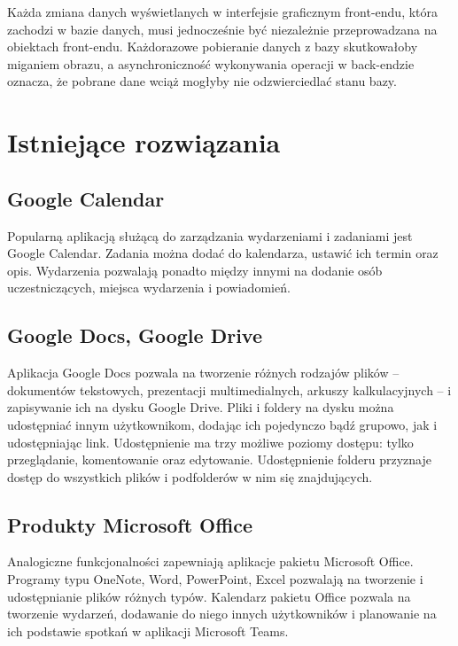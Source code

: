 \documentclass[a4paper,twoside,12pt]{book}
\begin{document}
Każda zmiana danych wyświetlanych w interfejsie graficznym front-endu, która zachodzi w bazie danych, musi jednocześnie być niezależnie przeprowadzana na obiektach front-endu. Każdorazowe pobieranie danych z bazy skutkowałoby miganiem obrazu, a asynchroniczność wykonywania operacji w back-endzie oznacza, że pobrane dane wciąż mogłyby nie odzwierciedlać stanu bazy.

\section{Istniejące rozwiązania}
\subsection{Google Calendar}
Popularną aplikacją służącą do zarządzania wydarzeniami i zadaniami jest Google Calendar. Zadania można dodać do kalendarza, ustawić ich termin oraz opis. Wydarzenia pozwalają ponadto między innymi na dodanie osób uczestniczących, miejsca wydarzenia i powiadomień.
\subsection{Google Docs, Google Drive}
Aplikacja Google Docs pozwala na tworzenie różnych rodzajów plików -- dokumentów tekstowych, prezentacji multimedialnych, arkuszy kalkulacyjnych -- i zapisywanie ich na dysku Google Drive. Pliki i foldery na dysku można udostępniać innym użytkownikom, dodając ich pojedynczo bądź grupowo, jak i udostępniając link. Udostępnienie ma trzy możliwe poziomy dostępu: tylko przeglądanie, komentowanie oraz edytowanie. Udostępnienie folderu przyznaje dostęp do wszystkich plików i podfolderów w nim się znajdujących.
\subsection{Produkty Microsoft Office}
Analogiczne funkcjonalności zapewniają aplikacje pakietu Microsoft Office. Programy typu OneNote, Word, PowerPoint, Excel pozwalają na tworzenie i udostępnianie plików różnych typów. Kalendarz pakietu Office pozwala na tworzenie wydarzeń, dodawanie do niego innych użytkowników i planowanie na ich podstawie spotkań w aplikacji Microsoft Teams.


\end{document}

